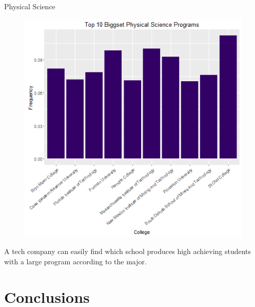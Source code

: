 \documentclass{article}
\begin{document}
Physical Science 
\begin{figure}[h!]
\includegraphics{../images/biggestPhysical.png}
\end{figure}


A tech company can easily find which school produces high achieving students with a large program according to the major. 

\section{Conclusions}
\end{document}
